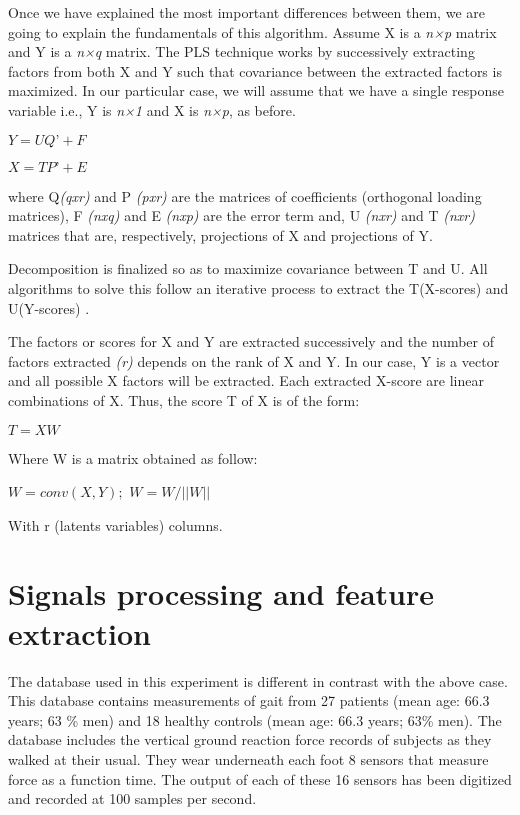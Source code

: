 Once we have explained the most important differences between them, we are going to explain the fundamentals of this algorithm. 
Assume X is a \textit{n×p} matrix and Y is a \textit{n×q} matrix. The PLS technique works by successively extracting factors from both X and Y such that covariance between the extracted factors is maximized. In our particular case, we will assume that we have a single response variable i.e., Y is \textit{n×1} and X is \textit{n×p}, as before.

\begin{center}
	$ Y= UQ’+F $

$ X=TP’+E $
\end{center}

where Q\textit{(qxr)} and P \textit{(pxr)} are the matrices of coefficients (orthogonal loading matrices), F \textit{(nxq)} and E \textit{(nxp)} are the error term and, U \textit{(nxr)} and T \textit{(nxr)} matrices that are, respectively, projections of X and projections of Y.

Decomposition is finalized so as to maximize covariance between T and U. All algorithms to solve this follow an iterative process to extract the T(X-scores) and U(Y-scores) \cite{pls_pca}. 

The factors or scores for X and Y are extracted successively and the number of factors extracted \textit{(r)} depends on the rank of X and Y. In our case, Y is a vector and all possible X factors will be extracted.
Each extracted X-score are linear combinations of X. Thus, the score T of X is of the form: 

\begin{center}
	$ T= XW $
\end{center}

Where  W is a matrix obtained as follow:

\begin{center}
	$ W= conv(X,Y); $
$ W = W/||W|| $
\end{center}

With r (latents variables) columns.

\section{Signals processing and feature extraction}
The database used in this experiment  is different in contrast with the above case. This database contains measurements of gait from 27 patients (mean age: 66.3 years; 63 \% men) and 18 healthy controls (mean age: 66.3 years; 63\% men). The database includes the vertical ground reaction force records of subjects as they walked at their usual. They wear underneath each foot 8 sensors \cite{Instr6} that measure force as a function time. The output of each of these 16 sensors has been digitized and recorded at 100 samples per second.

